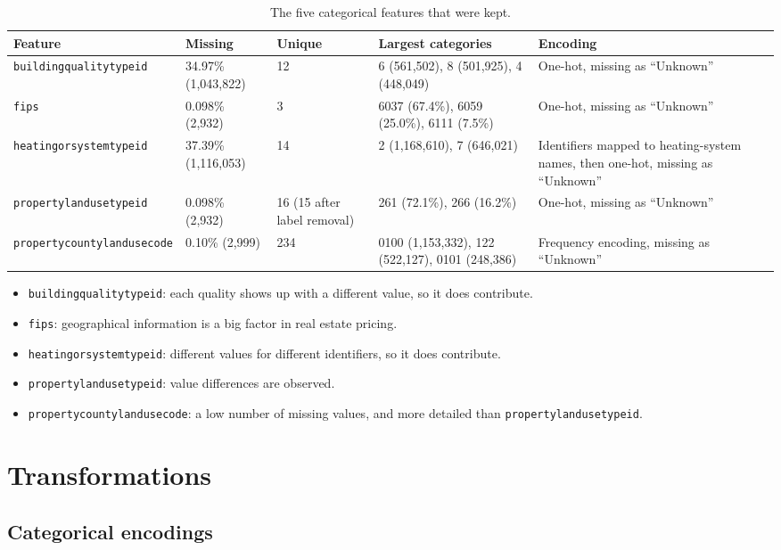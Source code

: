 \documentclass[sigconf,nonacm,10pt]{acmart}
\begin{document}
\begin{table}[t]
\caption{The five categorical features that were kept.}
\footnotesize
\begin{tabularx}{\textwidth}{@{}p{3.4cm}p{2.4cm}p{2.3cm}p{4.2cm}X@{}}
\toprule
Feature & Missing & Unique & Largest categories & Encoding \\
\midrule
\texttt{buildingqualitytypeid} & 34.97\% (1,043,822) & 12 & 6 (561,502), 8 (501,925), 4 (448,049) & One-hot, missing as ``Unknown'' \\
\texttt{fips} & 0.098\% (2,932) & 3 & 6037 (67.4\%), 6059 (25.0\%), 6111 (7.5\%) & One-hot, missing as ``Unknown'' \\
\texttt{heatingorsystemtypeid} & 37.39\% (1,116,053) & 14 & 2 (1,168,610), 7 (646,021) & Identifiers mapped to heating-system names, then one-hot, missing as ``Unknown'' \\
\texttt{propertylandusetypeid} & 0.098\% (2,932) & 16 (15 after label removal) & 261 (72.1\%), 266 (16.2\%) & One-hot, missing as ``Unknown'' \\
\texttt{propertycountylandusecode} & 0.10\% (2,999) & 234 & 0100 (1,153,332), 122 (522,127), 0101 (248,386) & Frequency encoding, missing as ``Unknown'' \\
\bottomrule
\end{tabularx}
\end{table}

\begin{itemize}
\item \texttt{buildingqualitytypeid}: each quality shows up with a different value, so it does contribute.
\item \texttt{fips}: geographical information is a big factor in real estate pricing.
\item \texttt{heatingorsystemtypeid}: different values for different identifiers, so it does contribute.
\item \texttt{propertylandusetypeid}: value differences are observed.
\item \texttt{propertycountylandusecode}: a low number of missing values, and more detailed than \texttt{propertylandusetypeid}.
\end{itemize}

\section{Transformations}

\subsection{Categorical encodings}
\end{document}
